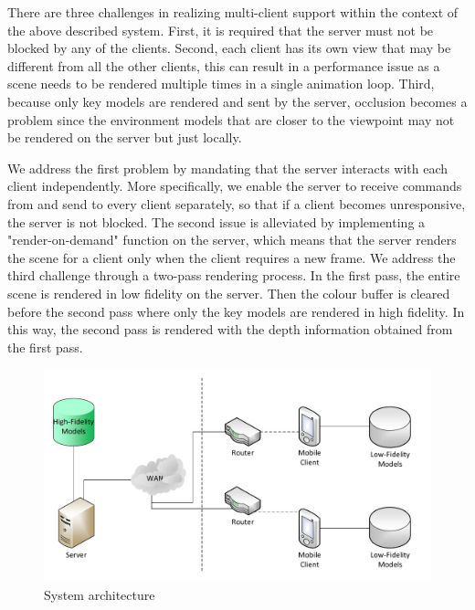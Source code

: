 There are three challenges in realizing multi-client support within the context of the above described system.
First, it is required that the server must not be blocked by any of the clients.
Second, each client has its own view that may be different from all the other clients, this can result in a performance issue as a scene needs to be rendered multiple times in a single animation loop.
Third, because only key models are rendered and sent by the server, occlusion becomes a problem since the environment models that are closer to the viewpoint may not be rendered on the server but just locally.

We address the first problem by mandating that the server interacts with each client independently. More specifically, we enable the server to receive commands from and send to every client separately, so that if a client becomes unresponsive, the server is not blocked.
The second issue is alleviated by implementing a "render-on-demand" function on the server, which means that the server renders the scene for a client only when the client requires a new frame.
We address the third challenge through a two-pass rendering process. In the first pass, the entire scene is rendered in low fidelity on the server. Then the colour buffer is cleared before the second pass where only the key models are rendered in high fidelity. In this way, the second pass is rendered with the depth information obtained from the first pass.

\begin{figure}[!htbp]
	\includegraphics[width=\textwidth]{figures/architecture.pdf}
	\caption{System architecture}
	\label{fig:architecture}
\end{figure}

